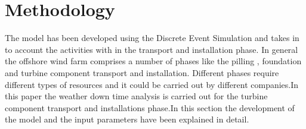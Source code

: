 \section{Methodology}
The model has been developed using the Discrete Event Simulation and takes in to account the activities with in the transport and installation phase. In general the offshore wind farm comprises a number of phases like the pilling , foundation and turbine component transport and installation. Different phases require different types of resources and it could be carried out by different companies.In this paper the weather down time analysis is carried out for the turbine component transport and installations phase.In this section the development of the model and the input  parameters have been explained in detail.